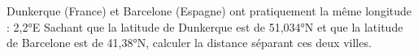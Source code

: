 
Dunkerque (France) et Barcelone (Espagne) ont pratiquement la même longitude : 2,2°E
Sachant que la latitude de Dunkerque est de 51,034°N et que la latitude de Barcelone est de
41,38°N, calculer la distance séparant ces deux villes.